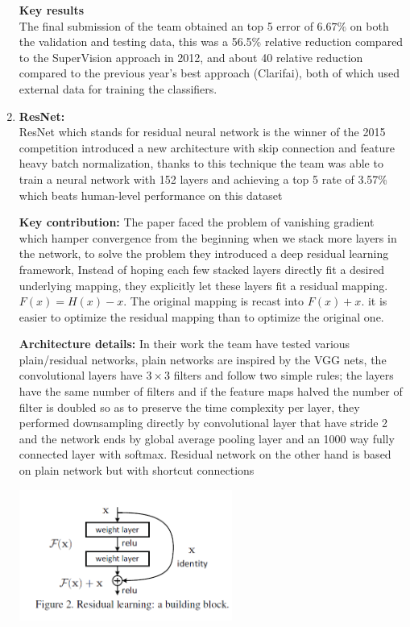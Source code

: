 \documentclass[12pt,a4paper]{report}
\begin{document}
\begin{enumerate}
\textbf{Key results}\\
The final submission of the team obtained an top 5 error of $6.67\%$ on both the validation and testing data, this was a 56.5\% relative reduction compared to the SuperVision approach in 2012, and about 40 relative reduction compared to the previous year’s best approach (Clarifai), both of which used external data for training the classifiers. \\

\item \textbf{ResNet:}\\
ResNet which stands for residual neural network is the winner of the 2015 competition introduced a new architecture with skip connection and feature heavy batch normalization, thanks to this technique the team was able to train a neural network with 152 layers and achieving a top 5 rate of 3.57\% which beats human-level performance on this dataset

\textbf{Key contribution:} 
The paper faced the problem of vanishing gradient which hamper convergence from the beginning when we stack more layers in the network, to solve the problem they introduced a deep residual learning framework, Instead of hoping each few stacked layers directly fit a desired underlying mapping, they  explicitly let these layers fit a residual mapping. $F(x)= H(x)-x $. The original mapping is recast into $F(x)+x$. it is easier to optimize the residual mapping than to optimize the original one. 

\textbf{Architecture details:}
In their work the team have tested various plain/residual networks, plain networks are inspired by the VGG nets, the convolutional layers have $3\times 3$ filters and follow two simple rules; the layers have the same number of filters and if the feature maps halved the number of filter is doubled so as to preserve the time complexity per layer, they performed downsampling directly by convolutional layer that have stride 2 and the network ends by global average pooling layer and an 1000 way fully connected layer with softmax. 
Residual network on the other hand is based on plain network but with shortcut connections 

\begin{center}
\includegraphics[width=7cm]{Capture2.png}
\end{center}


\end{enumerate}
\end{document}

